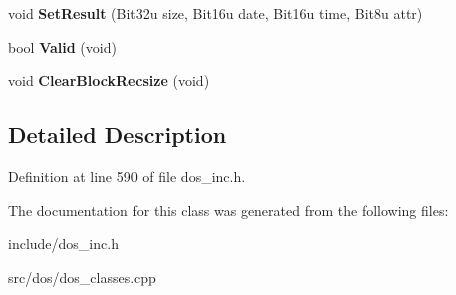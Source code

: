 \begin{DoxyCompactItemize}
\item 
\hypertarget{classDOS__FCB_a8f79505e07fa52a67461932141d3e12f}{void {\bfseries Set\-Result} (Bit32u size, Bit16u date, Bit16u time, Bit8u attr)}\label{classDOS__FCB_a8f79505e07fa52a67461932141d3e12f}

\item 
\hypertarget{classDOS__FCB_ab247afb9301a93fb192cd8d60acf6219}{bool {\bfseries Valid} (void)}\label{classDOS__FCB_ab247afb9301a93fb192cd8d60acf6219}

\item 
\hypertarget{classDOS__FCB_a31e05f1f41a0b62d5988e828d960d9b5}{void {\bfseries Clear\-Block\-Recsize} (void)}\label{classDOS__FCB_a31e05f1f41a0b62d5988e828d960d9b5}

\end{DoxyCompactItemize}


\subsection{Detailed Description}


Definition at line 590 of file dos\-\_\-inc.\-h.



The documentation for this class was generated from the following files\-:\begin{DoxyCompactItemize}
\item 
include/dos\-\_\-inc.\-h\item 
src/dos/dos\-\_\-classes.\-cpp\end{DoxyCompactItemize}
